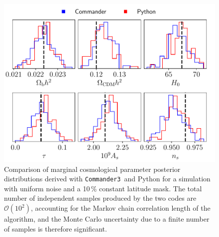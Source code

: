 \documentclass[twocolumn]{../common/aa}
\def\commanderthree{\texttt{Commander3}}
\begin{document}
\begin{figure}
	\centering
	\includegraphics[width=\linewidth]{figures/subplots_posterior_10_mask.pdf}
	\caption{\label{fig:mask10}Comparison of marginal cosmological parameter posterior distributions derived with \commanderthree\ and Python for a simulation with uniform noise and a 10\,\% constant latitude mask. The total number of independent samples produced by the two codes are $\mathcal{O}(10^2)$, accounting for the Markov chain correlation length of the algorithm, and the Monte Carlo uncertainty due to a finite number of samples is therefore significant.}
\end{figure}
\end{document}
